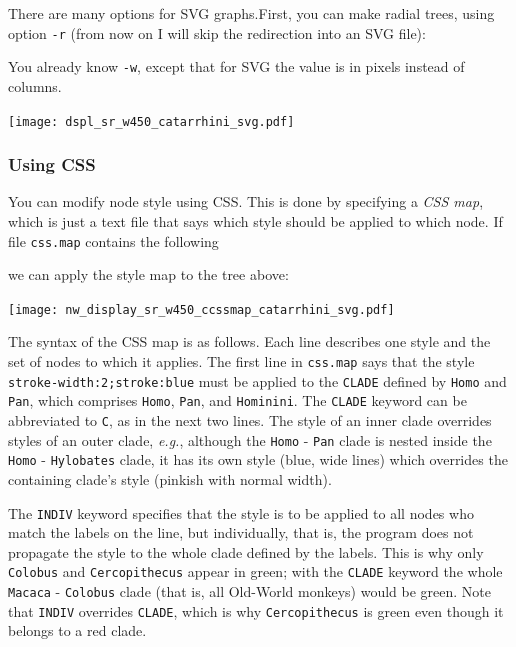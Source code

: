 \documentclass[a4paper,10pt]{report}
\newcommand{\svg}{\textsc{SVG}}
\newcommand{\css}{\textsc{CSS}}
\theoremstyle{definition}
\begin{document}
There are many options for \svg{} graphs.First, you can make radial trees, using option \texttt{-r} (from now on I will skip the redirection into an \svg{} file):



You already know \texttt{-w}, except that for \svg{} the value is in pixels instead of columns. 

\begin{center}
\texttt{[image: dspl\_sr\_w450\_catarrhini\_svg.pdf]}
\end{center}

\subsubsection{Using \css}
\label{sct_display_svg_css}

You can modify node style using \css. This is done by specifying a \textit{\css{} map}, which is just a text file that says which style should be applied to which node. If file \texttt{css.map} contains the following
\begin{quote}
 
\end{quote} 
we can apply the style map to the tree above:



\begin{center}
 \texttt{[image: nw\_display\_sr\_w450\_ccssmap\_catarrhini\_svg.pdf]}
\end{center}

The syntax of the \css{} map is as follows. Each line describes one style and the set of nodes to which it applies. The first line in \texttt{css.map} says that the style \texttt{stroke-width:2;stroke:blue} must be applied to the \texttt{CLADE} defined by \texttt{Homo} and \texttt{Pan}, which comprises \texttt{Homo}, \texttt{Pan}, and \texttt{Hominini}. The \texttt{CLADE} keyword can be abbreviated to \texttt{C}, as in the next two lines. The style of an inner clade overrides styles of an outer clade, \textit{e.g.}, although the \texttt{Homo} - \texttt{Pan} clade is nested inside the \texttt{Homo} - \texttt{Hylobates} clade, it has its own style (blue, wide lines) which overrides the containing clade's style (pinkish with normal width).

The \texttt{INDIV} keyword specifies that the style is to be applied to all nodes who match the labels on the line, but individually, that is, the program does not propagate the style to the whole clade defined by the labels. This is why only \texttt{Colobus} and \texttt{Cercopithecus} appear in green; with the \texttt{CLADE} keyword the whole \texttt{Macaca} - \texttt{Colobus} clade (that is, all Old-World monkeys) would be green. Note that \texttt{INDIV} overrides \texttt{CLADE}, which is why \texttt{Cercopithecus} is green even though it belongs to a red clade.
\end{document}
